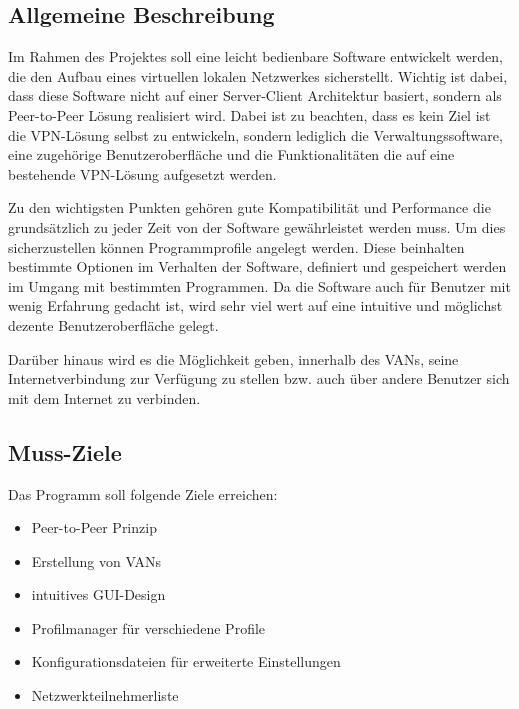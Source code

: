 \documentclass[a4paper,12pt]{scrreprt}
\begin{document}
		\subsection{Allgemeine Beschreibung}
		
		Im Rahmen des Projektes soll eine leicht bedienbare Software entwickelt werden, die den Aufbau eines virtuellen lokalen Netzwerkes sicherstellt. Wichtig ist dabei, dass diese Software nicht auf einer Server-Client Architektur basiert, sondern als Peer-to-Peer Lösung realisiert wird. Dabei ist zu beachten, dass es kein Ziel ist die VPN-Lösung selbst zu entwickeln, sondern lediglich die Verwaltungssoftware, eine zugehörige Benutzeroberfläche und die Funktionalitäten die auf eine bestehende VPN-Lösung aufgesetzt werden.
		
		Zu den wichtigsten Punkten gehören gute Kompatibilität und Performance die grundsätzlich zu jeder Zeit von der Software gewährleistet werden muss. Um dies sicherzustellen können Programmprofile angelegt werden. Diese beinhalten bestimmte Optionen im Verhalten der Software, definiert und gespeichert werden im Umgang mit bestimmten Programmen. Da die Software auch für Benutzer mit wenig Erfahrung gedacht ist, wird sehr viel wert auf eine intuitive und möglichst dezente Benutzeroberfläche gelegt.
		
		Darüber hinaus wird es die Möglichkeit geben, innerhalb des VANs, seine Internetverbindung zur Verfügung zu stellen bzw. auch über andere Benutzer sich mit dem Internet zu verbinden. 
		
			
		\subsection{Muss-Ziele}
		Das Programm soll folgende Ziele erreichen:\\
		\begin{itemize}
		\item Peer-to-Peer Prinzip
		\item Erstellung von VANs
		\item intuitives GUI-Design
		\item Profilmanager für verschiedene Profile
		\item Konfigurationsdateien für erweiterte Einstellungen
		\item Netzwerkteilnehmerliste
		
		\end{itemize}
		
			
\end{document}
